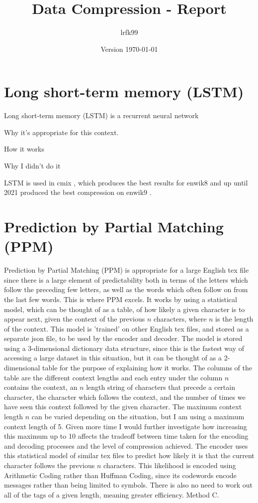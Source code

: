 \documentclass[a4paper, 11pt]{article}
\title{Data Compression - Report}
\date{Version \today}
\author{lrfk99}
\numberwithin{equation}{section}
\theoremstyle{plain}
\theoremstyle{definition}
\begin{document}
\maketitle



\section{Long short-term memory (LSTM)}
Long short-term memory (LSTM) is a recurrent neural network

Why it's appropriate for this context.

How it works

Why I didn't do it

LSTM is used in cmix \cite{cmix}, which produces the best results for enwik8 and 
up until 2021 \cite{bellard2021lossless} produced the best compression on enwik9 \cite{TextBenchmark}. 


\section{Prediction by Partial Matching (PPM)}

Prediction by Partial Matching (PPM) is appropriate for a large English tex file since there is a large element of 
predictability both in terms of the letters which follow the preceding few letters, 
as well as the words which often follow on from the last few words. 
This is where PPM excels. 
It works by using a statistical model, which can be thought of as a table, 
of how likely a given character is to appear next, given the context of the previous $n$ characters, where $n$ is 
the length of the context. 
This model is 'trained' on other English tex files, and stored as a separate json file, 
to be used by the encoder and decoder. 
The model is stored using a 3-dimensional dictionary data structure, since this is the fastest way of accessing a large 
dataset in this situation, but it can be thought of as a 2-dimensional table for the purpose of explaining how it works. 
The columns of the table are the different context lengths and each entry under the column $n$ contains the context, 
an $n$ length string of characters that precede a certain character, the character which follows the context, 
and the number of times we have seen this context followed by the given character. 
The maximum context length $n$ can be varied depending on the situation, but I am using a maximum context length of 5. 
Given more time I would further investigate how increasing this maximum up to 10 affects the tradeoff between 
time taken for the encoding and decoding processes and the level of compression achieved. 
The encoder uses this statistical model of similar tex files to predict how likely it is that the current character follows 
the previous $n$ characters. 
This likelihood is encoded using Arithmetic Coding rather than Huffman Coding, since its codewords 
encode messages rather than being limited to symbols. 
There is also no need to work out all of the tags of a given length, meaning greater efficiency. 
Method C.
\end{document}
